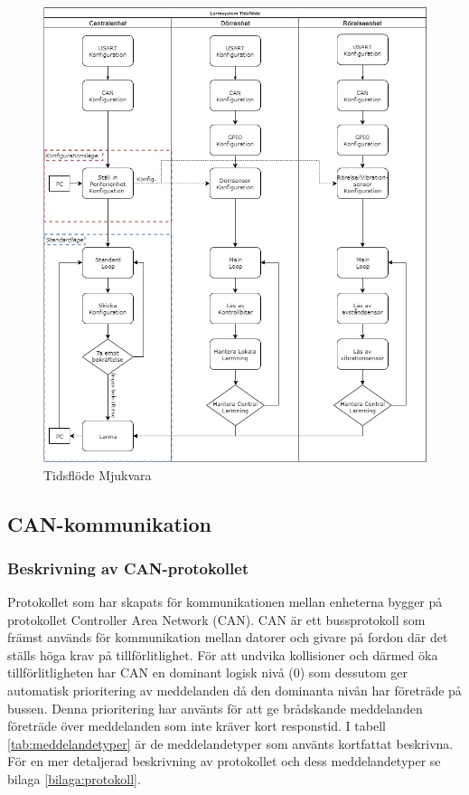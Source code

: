 \documentclass{article}
\begin{document}
\begin{figure}[H]
    \centering
    \includegraphics[width=1\textwidth]{figurer/TidsFlode.jpg}
    \caption{Tidsflöde Mjukvara}
    \label{fig:tidsflöde}
\end{figure}


\subsection{CAN-kommunikation}
\label{can}
\subsubsection{Beskrivning av CAN-protokollet}
Protokollet som har skapats för kommunikationen mellan enheterna bygger på protokollet Controller Area Network (CAN).
CAN är ett bussprotokoll som främst används för kommunikation mellan datorer och givare på fordon där det ställs höga krav på tillförlitlighet.
För att undvika kollisioner och därmed öka tillförlitligheten har CAN en dominant logisk nivå (0) som dessutom ger automatisk prioritering av meddelanden då den dominanta nivån har företräde på bussen.
Denna prioritering har använts för att ge brådskande meddelanden företräde över meddelanden som inte kräver kort responstid. I tabell \ref{tab:meddelandetyper} är de meddelandetyper som använts kortfattat beskrivna. För en mer detaljerad beskrivning av protokollet och dess meddelandetyper se bilaga \ref{bilaga:protokoll}.
\end{document}
